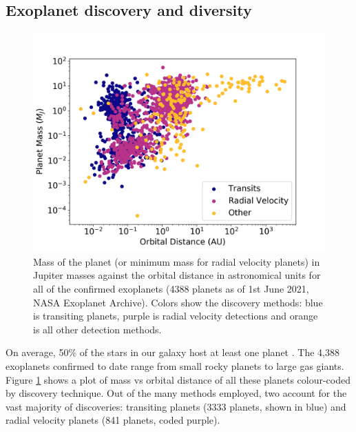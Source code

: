 \subsection{Exoplanet discovery and diversity} %

\begin{figure}
    \centering
    \includegraphics[width = \linewidth]{MA_NASAexo.png}
    \caption{Mass of the planet (or minimum mass for radial velocity planets) in Jupiter masses against the orbital distance in astronomical units for all of the confirmed exoplanets (4388 planets as of 1st June 2021, NASA Exoplanet Archive). Colors show the discovery methods: blue is transiting planets, purple is radial velocity detections and orange is all other detection methods.}
    \label{int:fig:ma}
\end{figure}


On average, 50\% of the stars in our galaxy host at least one planet \citep{Howard2012,Dressing2013,Batalha2013,Silburt2015}. The 4,388 exoplanets confirmed to date range from small rocky planets to large gas giants. Figure \ref{int:fig:ma} shows a plot of mass vs orbital distance of all these planets colour-coded by discovery technique. Out of the many methods employed, two account for the vast majority of discoveries: transiting planets (3333 planets, shown in blue) and radial velocity planets (841 planets, coded purple).

